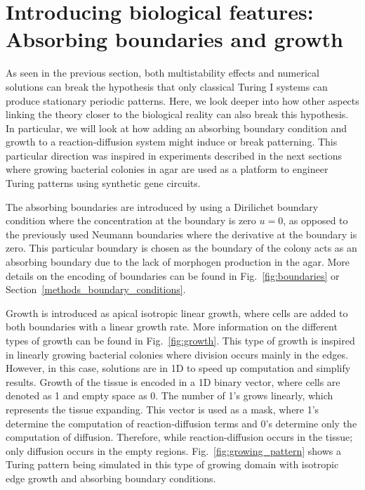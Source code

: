 \section{Introducing biological features: Absorbing boundaries and growth}
As seen in the previous section, both multistability effects and numerical solutions can break the hypothesis that only classical Turing I systems can produce stationary periodic patterns.
Here, we look deeper into how other aspects linking the theory closer to the biological reality can also break this hypothesis.
In particular, we will look at how adding an absorbing boundary condition and growth to a reaction-diffusion system might induce or break patterning.
This particular direction was inspired in experiments described in the next sections where growing bacterial colonies in agar are used as a platform to engineer Turing patterns using synthetic gene circuits.

The absorbing boundaries are introduced by using a Dirilichet boundary condition where the concentration at the boundary is zero $u=0$, as opposed to the previously used Neumann boundaries where the derivative at the boundary is zero.
This particular boundary is chosen as the boundary of the colony acts as an absorbing boundary due to the lack of morphogen production in the agar.
More details on the encoding of boundaries can be found in Fig.~\ref{fig:boundaries} or Section~\ref{methods_boundary_conditions}. %

Growth is introduced as apical isotropic linear growth, where cells are added to both boundaries with a linear growth rate.
More information on the different types of growth can be found in Fig.~\ref{fig:growth}.
This type of growth is inspired in linearly growing bacterial colonies where division occurs mainly in the edges.
However, in this case, solutions are in 1D to speed up computation and simplify results.
Growth of the tissue is encoded in a 1D binary vector, where cells are denoted as 1 and empty space as 0.
The number of 1's grows linearly, which represents the tissue expanding.
This vector is used as a mask, where 1's determine the computation of reaction-diffusion terms and 0's determine only the computation of diffusion.
Therefore, while reaction-diffusion occurs in the tissue; only diffusion occurs in the empty regions.
Fig.~\ref{fig:growing_pattern} shows a Turing pattern being simulated in this type of growing domain with isotropic edge growth and absorbing boundary conditions.

